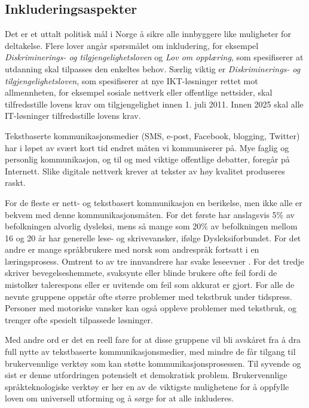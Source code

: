 \begin{multicols}{2}
\subsection{Inkluderingsaspekter} 

Det er et uttalt politisk mål i Norge å sikre alle innbyggere like muligheter for deltakelse. 
Flere lover angår spørsmålet om inkludering, for eksempel \textit{Diskriminerings- og tilgjengelighetsloven} og \textit{Lov om opplæring}, som spesifiserer at utdanning skal tilpasses den enkeltes behov. 
Særlig viktig er \textit{Diskriminerings- og tilgjengelighetsloven}, som spesifiserer at nye IKT-løsninger rettet mot allmennheten, for eksempel sosiale nettverk eller offentlige nettsider, skal tilfredsstille lovens krav om tilgjengelighet innen 1. juli 2011. 
Innen 2025 skal alle IT-løsninger tilfredsstille lovens krav.

Tekstbaserte kommunikasjonsmedier (SMS, e-post, Facebook, blogging, Twitter) har i løpet av svært kort tid endret måten vi kommuniserer på. 
Mye faglig og personlig kommunikasjon, og til og med viktige offentlige debatter, foregår på Internett. Slike digitale nettverk krever at tekster av høy kvalitet produseres raskt.

For de fleste er nett- og tekstbasert kommunikasjon en berikelse, men ikke alle er bekvem med denne kommunikasjonsmåten. 
For det første har anslagsvis 5\% av befolkningen alvorlig dysleksi, mens så mange som 20\% av befolkningen mellom 16 og 20 år har generelle lese- og skrivevansker, ifølge Dysleksiforbundet. 
For det andre er mange språkbrukere med norsk som andrespråk fortsatt i en læringsprosess. 
Omtrent to av tre innvandrere har svake leseevner \cite{gabrielsen2007}.
For det tredje skriver bevegelseshemmete, svaksynte eller blinde brukere ofte feil fordi de mistolker talerespons eller er uvitende om feil som akkurat er gjort. 
For alle de nevnte gruppene oppstår ofte større problemer med tekstbruk under tidspress. 
Personer med motoriske vansker kan også oppleve problemer med tekstbruk, og trenger ofte spesielt tilpassede løsninger.

Med andre ord er det en reell fare for at disse gruppene vil bli avskåret fra å dra full nytte av tekstbaserte kommunikasjonsmedier, med mindre de får tilgang til brukervennlige verktøy som kan støtte kommunikasjonsprosessen. 
Til syvende og sist er denne utfordringen potensielt et demokratisk problem. 
Brukervennlige språkteknologiske verktøy er her en av de viktigste mulighetene for å oppfylle loven om universell utforming og å sørge for at alle inkluderes.


\end{multicols}
